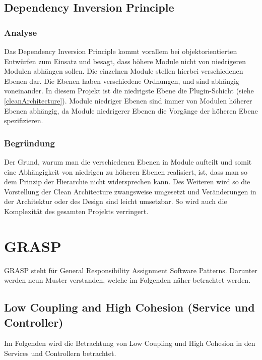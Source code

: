 \subsection{Dependency Inversion Principle}

        \subsubsection{Analyse}
        Das Dependency Inversion Principle kommt vorallem bei objektorientierten Entwürfen zum Einsatz und besagt, dass höhere Module nicht von niedrigeren Modulen abhängen sollen. Die einzelnen Module stellen hierbei verschiedenen Ebenen dar. Die Ebenen haben verschiedene Ordnungen, und sind abhängig voneinander. In diesem Projekt ist die niedrigste Ebene die Plugin-Schicht (siehe \cref{cleanArchitecture}). Module niedriger Ebenen sind immer von Modulen höherer Ebenen abhängig, da Module niedrigerer Ebenen die Vorgänge der höheren Ebene spezifizieren.
        
        \subsubsection{Begründung}
        Der Grund, warum man die verschiedenen Ebenen in Module aufteilt und somit eine Abhängigkeit von niedrigen zu höheren Ebenen realisiert, ist, dass man so dem Prinzip der Hierarchie nicht widersprechen kann. Des Weiteren wird so die Vorstellung der Clean Architecture zwangsweise umgesetzt und Veränderungen in der Architektur oder des Design sind leicht umsetzbar. So wird auch die Komplexität des gesamten Projekts verringert.

\section{GRASP}
GRASP steht für General Responsibility Assignment Software Patterns. Darunter werden neun Muster verstanden, welche im Folgenden näher betrachtet werden.

	\subsection{Low Coupling and High Cohesion (Service und Controller)}
	Im Folgenden wird die Betrachtung von Low Coupling und High Cohesion in den Services und Controllern betrachtet.
